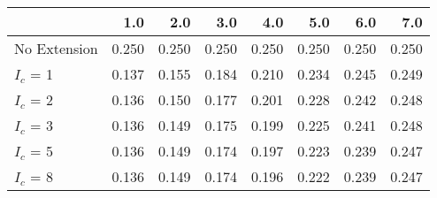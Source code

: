 \begin{tabular}{lrrrrrrr}
\toprule
{} &   1.0 &   2.0 &   3.0 &   4.0 &   5.0 &   6.0 &   7.0 \\
\midrule
No Extension & 0.250 & 0.250 & 0.250 & 0.250 & 0.250 & 0.250 & 0.250 \\
$I_c$ = 1    & 0.137 & 0.155 & 0.184 & 0.210 & 0.234 & 0.245 & 0.249 \\
$I_c$ = 2    & 0.136 & 0.150 & 0.177 & 0.201 & 0.228 & 0.242 & 0.248 \\
$I_c$ = 3    & 0.136 & 0.149 & 0.175 & 0.199 & 0.225 & 0.241 & 0.248 \\
$I_c$ = 5    & 0.136 & 0.149 & 0.174 & 0.197 & 0.223 & 0.239 & 0.247 \\
$I_c$ = 8    & 0.136 & 0.149 & 0.174 & 0.196 & 0.222 & 0.239 & 0.247 \\
\bottomrule
\end{tabular}
